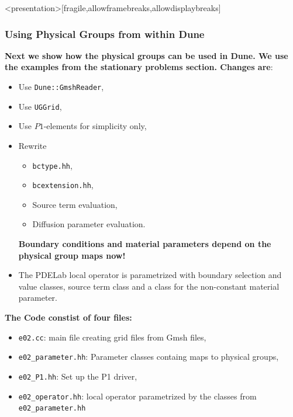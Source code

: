 \begin{frame}<presentation>[fragile,allowframebreaks,allowdisplaybreaks]
  \frametitle{Using Physical Groups from within Dune}
  \textbf{Next we show how the physical groups can be used in Dune. We use the
  examples from the stationary problems section. Changes are}:
  \begin{itemize}
    \item Use \lstinline!Dune::GmshReader!,
    \item Use \lstinline!UGGrid!,
    \item Use $P1$-elements for simplicity only,
    \item Rewrite
      \begin{itemize}
        \item \lstinline!bctype.hh!,
        \item \lstinline!bcextension.hh!,
        \item Source term evaluation,
        \item Diffusion parameter evaluation.
      \end{itemize}
      \textbf{Boundary conditions and material parameters depend on the physical group
      maps now!}
    \item The PDELab local operator is parametrized with boundary selection and value
      classes, source term class and a class for the non-constant material
      parameter.
  \end{itemize}
  \textbf{The Code constist of four files:}
  \begin{itemize}
    \item \lstinline!e02.cc!: main file creating grid files from Gmsh files,
    \item \lstinline!e02_parameter.hh!: Parameter classes containg maps to
      physical groups,
    \item \lstinline!e02_P1.hh!: Set up the P1 driver,
    \item \lstinline!e02_operator.hh!: local operator parametrized by the
      classes from \lstinline!e02_parameter.hh!
  \end{itemize}
\end{frame}

